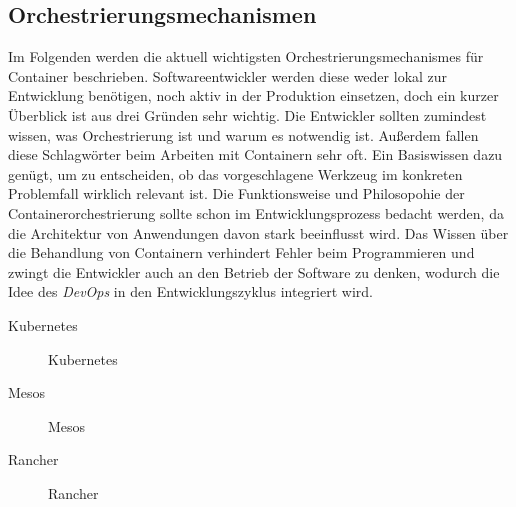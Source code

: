 \subsection{Orchestrierungsmechanismen}
\label{sec:orchestrierungsmechanismen}
Im Folgenden werden die aktuell wichtigsten Orchestrierungsmechanismes für Container beschrieben.
Softwareentwickler werden diese weder lokal zur Entwicklung benötigen, noch aktiv in der Produktion einsetzen, doch ein kurzer Überblick ist aus drei Gründen sehr wichtig.
Die Entwickler sollten zumindest wissen, was Orchestrierung ist und warum es notwendig ist.
Außerdem fallen diese Schlagwörter beim Arbeiten mit Containern sehr oft. Ein Basiswissen dazu genügt, um zu entscheiden, ob das vorgeschlagene Werkzeug im konkreten Problemfall wirklich relevant ist.
Die Funktionsweise und Philosopohie der Containerorchestrierung sollte schon im Entwicklungsprozess bedacht werden, da die Architektur von Anwendungen davon stark beeinflusst wird.
Das Wissen über die Behandlung von Containern verhindert Fehler beim Programmieren und zwingt die Entwickler auch an den Betrieb der Software zu denken, wodurch die Idee des \emph{DevOps} in den Entwicklungszyklus integriert wird.

\begin{description}
    \item [Kubernetes] Kubernetes
    \item [Mesos] Mesos
    \item [Rancher] Rancher
\end{description}
